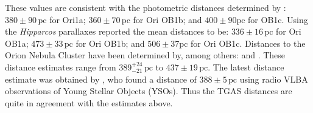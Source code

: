 \documentclass[twocolumn]{aa}
\begin{document}
These values are consistent with the photometric distances determined by \cite{Brown1994}: $380 \pm 90 \, \mathrm{pc}$ for Ori1a; $360 \pm 70\, \mathrm{pc}$ for Ori OB1b; and $400 \pm 90 \mathrm{pc}$ for OB1c.
Using the \textit{Hipparcos} parallaxes \cite{deZeeuw1999} reported the mean distances to be:  $336 \pm 16 \, \mathrm{pc}$ for Ori OB1a; $473 \pm 33\, \mathrm{pc}$ for Ori OB1b; and $506 \pm 37 \mathrm{pc}$ for Ori OB1c. 
Distances to the Orion Nebula Cluster have been determined by, among others: \citet{Stassun2004, Hirota2007, Jeffries2007, Menten2007, Sandstrom2007, Kim2008} and \citet{Kraus2009}. These distance estimates range from $389^{+24}_{-21} \, \mathrm{pc}$ to  $437 \pm 19\, \mathrm{pc}$. The latest distance estimate was obtained by \cite{Kounkel2017a}, who found a distance of $388 \pm 5 \, \mathrm{pc}$  using radio VLBA observations of Young Stellar Objects (YSOs). Thus the TGAS distances are quite in agreement with the estimates above.
\end{document}
